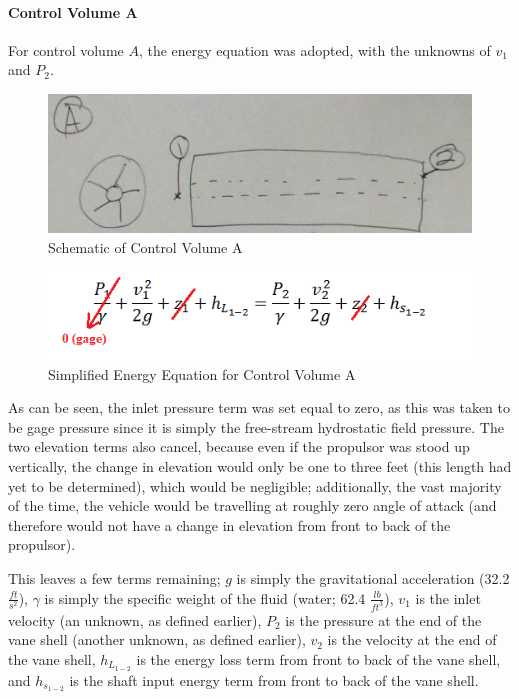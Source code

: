 \documentclass{report}
\begin{document}
\paragraph{Control Volume A}
For control volume $A$, the energy equation was adopted, with the unknowns of $v_1$ and $P_2$.
\begin{figure}[H]
\centering
\includegraphics{"Ctrl Volume A"}
\caption{Schematic of Control Volume A}
\end{figure}
\begin{figure}[H]
\centering
\includegraphics{"Eqn A"}
\caption{Simplified Energy Equation for Control Volume A}
\end{figure}
As can be seen, the inlet pressure term was set equal to zero, as this was taken to be gage pressure since it is simply the free-stream hydrostatic field pressure.  The two elevation terms also cancel, because even if the propulsor was stood up vertically, the change in elevation would only be one to three feet (this length had yet to be determined), which would be negligible; additionally, the vast majority of the time, the vehicle would be travelling at roughly zero angle of attack (and therefore would not have a change in elevation from front to back of the propulsor).\par
This leaves a few terms remaining; $g$ is simply the gravitational acceleration (32.2 $\frac{ft}{s^2}$), $\gamma$ is simply the specific weight of the fluid (water; 62.4 $\frac{lb}{ft^3}$), $v_1$ is the inlet velocity (an unknown, as defined earlier), $P_2$ is the pressure at the end of the vane shell (another unknown, as defined earlier), $v_2$ is the velocity at the end of the vane shell, $h_{L_{1-2}}$ is the energy loss term from front to back of the vane shell, and $h_{s_{1-2}}$ is the shaft input energy term from front to back of the vane shell.\par
\end{document}
